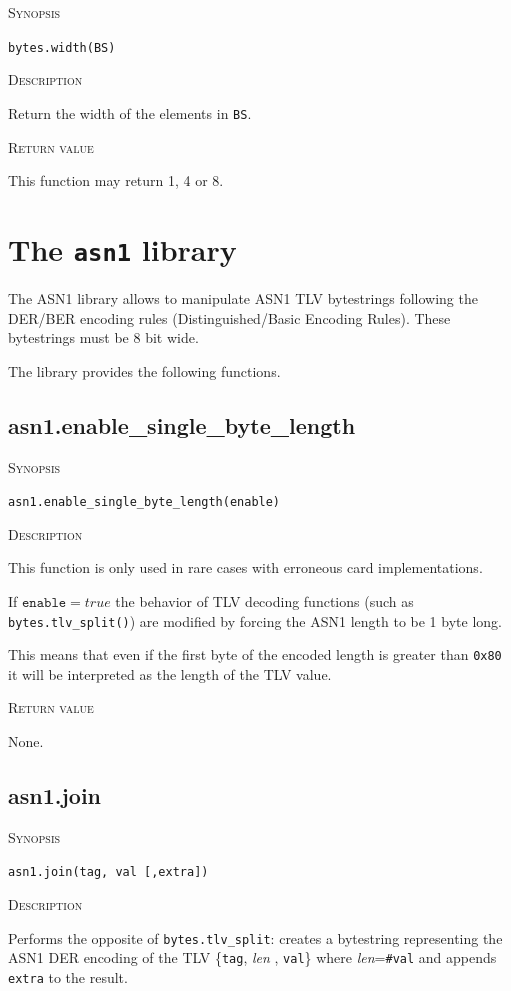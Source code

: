 \documentclass[11pt]{report}
\newcommand{\mansection}[1]{\vspace{0.5em}\par\noindent\textsc{#1}\vspace{0.5em}\par}
\newcommand{\syn}[1]{\texttt{#1}}
\begin{document}
\mansection{Synopsis}
\syn{bytes.width(BS)}

\mansection{Description}
  Return the width of the elements in \syn{BS}.

\mansection{Return value}
  This function may return 1, 4 or 8.


\section{The \syn{asn1} library}

The ASN1 library allows to manipulate ASN1 TLV bytestrings following the DER/BER 
encoding rules (Distinguished/Basic Encoding Rules).
These bytestrings must be 8 bit wide.

The library provides the following functions.


\subsection{asn1.enable\_single\_byte\_length}

\mansection{Synopsis}
\syn{asn1.enable\_single\_byte\_length(enable)}

\mansection{Description}
  This function is only used in rare cases with erroneous card implementations.
  
  If $\syn{enable}=true$ the behavior of TLV decoding functions 
  (such as \syn{bytes.tlv\_split()}) are modified by forcing the ASN1 
  length to be 1 byte long. 
  
  This means that even if the first byte of the encoded length is greater 
  than \syn{0x80} it will be interpreted as the length of the TLV value.

\mansection{Return value}
  None.

\subsection{asn1.join}

\mansection{Synopsis}
\syn{asn1.join(tag, val [,extra])}

\mansection{Description}
  Performs the opposite of \syn{bytes.tlv\_split}: creates a bytestring 
  representing the ASN1 DER encoding of the TLV \{\syn{tag}, \textit{len} , \syn{val}\} where \textit{len}=\syn{\#val} 
  and appends \syn{extra} to the result.
\end{document}
